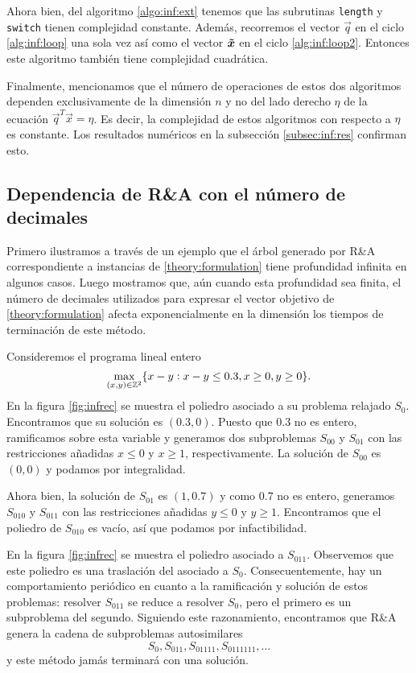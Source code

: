 Ahora bien, del algoritmo \ref{algo:inf:ext} tenemos que las subrutinas \texttt{length} y
\texttt{switch} tienen complejidad constante. Además, recorremos el vector $\vec{q}$ en el ciclo
\ref{alg:inf:loop} una sola vez así como el vector $\boldsymbol{\tilde{x}}$ en el ciclo \ref{alg:inf:loop2}.
Entonces este algoritmo también tiene complejidad cuadrática.

Finalmente, mencionamos que el número de operaciones de estos dos algoritmos dependen exclusivamente de la
dimensión $n$ y no del lado derecho $\eta$ de la ecuación $\vec{q}^T\vec{x} = \eta$. Es decir, la
complejidad de estos algoritmos con respecto a $\eta$ es constante. Los resultados numéricos en la
subsección \ref{subsec:inf:res} confirman esto.

\subsection{Dependencia de R\&A con el número de decimales}
\label{subsec:inf:int}
\noindent
Primero ilustramos a través de un ejemplo que el árbol generado por R\&A correspondiente a instancias de
\eqref{theory:formulation} tiene profundidad infinita en algunos casos. Luego mostramos que, aún
cuando esta profundidad sea finita, el número de decimales utilizados para expresar el vector
objetivo de \eqref{theory:formulation} afecta exponencialmente en la dimensión los tiempos de
terminación de este método.

\begin{example}
	\label{ex:inf}
	Consideremos el programa lineal entero
	\begin{equation*}
		\max_{(x, y) \in \mathbb{Z}^2}\lbrace x - y \vcentcolon x - y \leq 0.3, x \geq 0, y \geq 0 \rbrace.
	\end{equation*}
	En la figura \ref{fig:infrec} se muestra el poliedro asociado a su problema relajado $S_0$.
	Encontramos que su solución es $(0.3, 0)$. Puesto que $0.3$ no
	es entero, ramificamos sobre esta variable y generamos dos subproblemas $S_{00}$ y $S_{01}$ con
	las restricciones añadidas $x \leq 0$ y $x \geq 1$, respectivamente. La solución de $S_{00}$
	es $(0, 0)$ y podamos por integralidad.

	Ahora bien, la solución de $S_{01}$ es $(1, 0.7)$ y como $0.7$ no es entero, generamos $S_{010}$
	y $S_{011}$ con las restricciones añadidas $y \leq 0$ y $y \geq 1$. Encontramos que el poliedro
	de $S_{010}$ es vacío, así que podamos por infactibilidad.

	En la figura \ref{fig:infrec} se muestra el poliedro asociado a $S_{011}$. Observemos que este poliedro es
	una traslación del asociado a $S_0$. Consecuentemente, hay un comportamiento
	periódico en cuanto a la ramificación y solución de estos problemas: resolver $S_{011}$ se
	reduce a resolver $S_0$, pero el primero es un subproblema del segundo. Siguiendo este
	razonamiento, encontramos que R\&A genera la cadena de subproblemas autosimilares
	\begin{equation*}
		S_0, S_{011}, S_{01111}, S_{0111111}, \ldots
	\end{equation*}
	y este método jamás terminará con una solución.
\end{example}

